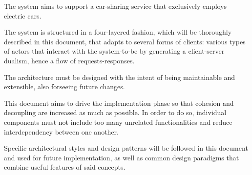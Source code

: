 The system aims to support a car-sharing service that exclusively employs electric cars.

The system is structured in a four-layered fashion, which will be thoroughly described in this document, that adapts to several forms of clients: various types of actors that interact with the system-to-be by generating a client-server dualism, hence a flow of requests-responses.

The architecture must be designed with the intent of being maintainable and extensible, also forseeing future changes.

This document aims to drive the implementation phase so that cohesion and decoupling are increased as much as possible. In order to do so, individual components must not include too many unrelated functionalities and reduce interdependency between one another.

Specific architectural styles and design patterns will be followed in this document and used for future implementation, as well as common design paradigms that combine useful features of said concepts.